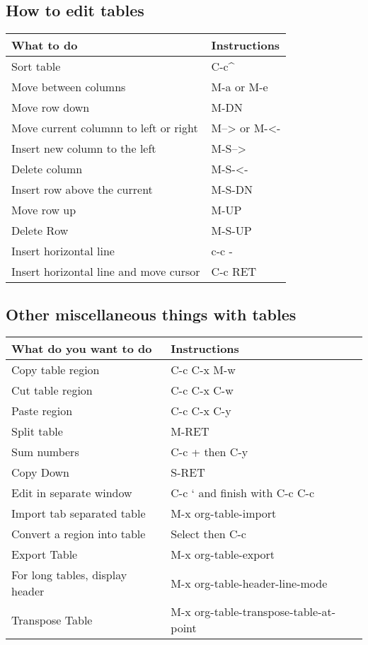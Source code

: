 \documentclass[11pt]{article}
\begin{document}
\subsection{How to edit tables}
\label{sec:org705b2c0}

\begin{center}
\begin{tabular}{ll}
What to do & Instructions\\
\hline
Sort table & C-c\^{}\\
Move between columns & M-a or M-e\\
Move row down & M-DN\\
Move current columnn to left or right & M--> or M-<-\\
Insert new column to the left & M-S-->\\
Delete column & M-S-<-\\
Insert row above the current & M-S-DN\\
Move row up & M-UP\\
Delete Row & M-S-UP\\
Insert horizontal line & c-c -\\
Insert horizontal line and move cursor & C-c RET\\
\end{tabular}
\end{center}

\subsection{Other miscellaneous things with tables}
\label{sec:orgf5dca00}

\begin{center}
\begin{tabular}{ll}
What do you want to do & Instructions\\
\hline
Copy table region & C-c C-x M-w\\
Cut table region & C-c C-x C-w\\
Paste region & C-c C-x C-y\\
Split table & M-RET\\
Sum numbers & C-c + then C-y\\
Copy Down & S-RET\\
Edit in separate window & C-c ` and finish with C-c C-c\\
Import tab separated table & M-x org-table-import\\
Convert a region into table & Select then C-c\\
Export Table & M-x org-table-export\\
For long tables, display header & M-x org-table-header-line-mode\\
Transpose Table & M-x org-table-transpose-table-at-point\\
\end{tabular}
\end{center}
\end{document}
